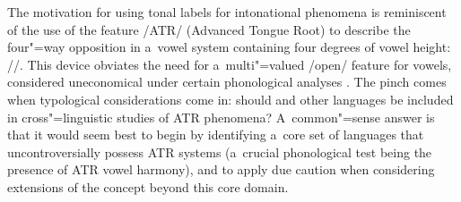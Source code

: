 The motivation for using tonal labels for intonational phenomena is reminiscent of the use of the feature /ATR/ (Advanced Tongue Root) to describe the four"=way opposition in a~vowel
system containing four degrees of vowel height: //. This device obviates the need for a~multi"=valued /open/ feature for vowels,
considered uneconomical under certain phonological analyses \citep{calabrese2000}. The pinch comes when typological
considerations come in: should  and other  languages be
included in cross"=linguistic studies of ATR phenomena? A~common"=sense answer is that it would seem best to
begin by identifying a~core set of languages that uncontroversially possess ATR systems (a~crucial
phonological test being the presence of ATR vowel harmony), and to apply due caution when
considering extensions of the concept beyond this core domain.

